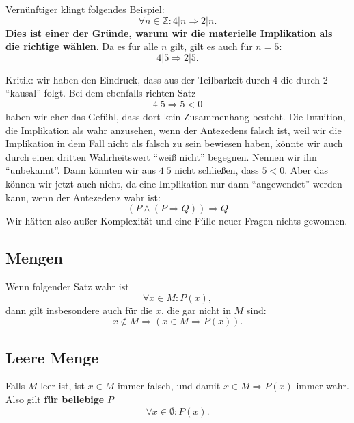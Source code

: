 \documentclass[a4paper]{amsart}
\theoremstyle{definition}
\newcommand{\Z}{\ensuremath{\mathbb{ Z }}}
\begin{document}
Vernünftiger klingt folgendes Beispiel:
\begin{equation}
   \forall n \in \Z \colon 4 | n \Rightarrow  2 | n.
\end{equation} 
\textbf{Dies ist einer der Gründe, warum wir die materielle Implikation als die richtige wählen}. Da es für alle $n$ gilt, gilt es auch für $n=5$:
\begin{equation}
   4 | 5 \Rightarrow  2 | 5.
\end{equation} 

Kritik: wir haben den Eindruck, dass aus der Teilbarkeit durch 4 die durch 2 "`kausal"' folgt. Bei dem ebenfalls richten Satz
\begin{equation}
   4 | 5 \Rightarrow  5 < 0
\end{equation} 
haben wir eher das Gefühl, dass dort kein Zusammenhang besteht. Die Intuition, die Implikation als wahr anzusehen, wenn der Antezedens falsch ist, weil wir die Implikation in dem Fall nicht als falsch zu sein bewiesen haben, könnte wir auch durch einen dritten Wahrheitswert "`weiß nicht"' begegnen. Nennen wir ihn "`unbekannt"'. Dann könnten wir aus $4|5$ nicht schließen, dass $5<0$. Aber das können wir jetzt auch nicht, da eine Implikation nur dann "`angewendet"' werden kann, wenn der Antezedenz wahr ist:
\begin{equation}
   (P \land (P \Rightarrow  Q)) \Rightarrow Q
\end{equation}
Wir hätten also außer Komplexität und eine Fülle neuer Fragen nichts gewonnen.

\subsection{Mengen}
Wenn folgender Satz wahr ist
\begin{equation}
   \forall x \in M \colon P(x),
\end{equation}
dann gilt insbesondere auch für die $x$, die gar nicht in $M$ sind:
\begin{equation}
   x \notin M \Rightarrow (x \in M \Rightarrow P(x)).
\end{equation}

\subsection{Leere Menge}
Falls $M$ leer ist, ist $x \in M$ immer falsch, und damit $x \in M \Rightarrow P(x)$ immer wahr. Also gilt \textbf{für beliebige} $P$
\begin{equation}
   \forall x \in \emptyset \colon P(x).
\end{equation}
\end{document}
